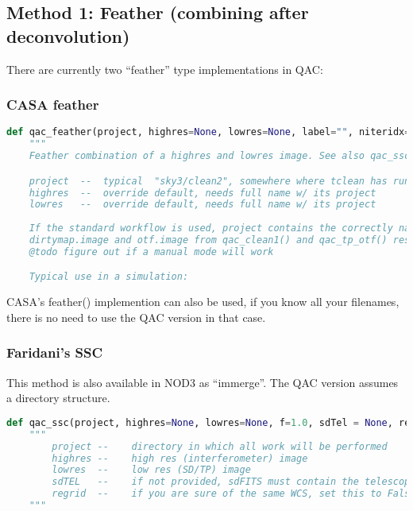 \documentclass[12pt,a4paper]{article}
\begin{document}
\subsection{Method 1: Feather (combining after deconvolution)}

There are currently two ``feather'' type implementations in QAC:

\subsubsection{CASA feather}

\begin{lstlisting}[language=Python]
def qac_feather(project, highres=None, lowres=None, label="", niteridx=0, name="dirtymap"):
    """
    Feather combination of a highres and lowres image. See also qac_ssc()

    project  --  typical  "sky3/clean2", somewhere where tclean has run
    highres  --  override default, needs full name w/ its project
    lowres   --  override default, needs full name w/ its project
    
    If the standard workflow is used, project contains the correctly named
    dirtymap.image and otf.image from qac_clean1() and qac_tp_otf() resp.
    @todo figure out if a manual mode will work

    Typical use in a simulation:
\end{lstlisting}

CASA's feather() implemention can also be used, if you know all your filenames, there is no need to use the QAC version
in that case.

\subsubsection{Faridani's SSC}

This method is also available in NOD3 as ``immerge''. The QAC version assumes a directory structure.

\begin{lstlisting}[language=Python]
def qac_ssc(project, highres=None, lowres=None, f=1.0, sdTel = None, regrid=True, cleanup=True, label="", niteridx=0, name="dirtymap"):
    """
        project --    directory in which all work will be performed
        highres --    high res (interferometer) image
        lowres  --    low res (SD/TP) image
        sdTEL   --    if not provided, sdFITS must contain the telescope
        regrid  --    if you are sure of the same WCS, set this to False
    """
\end{lstlisting}
\end{document}
